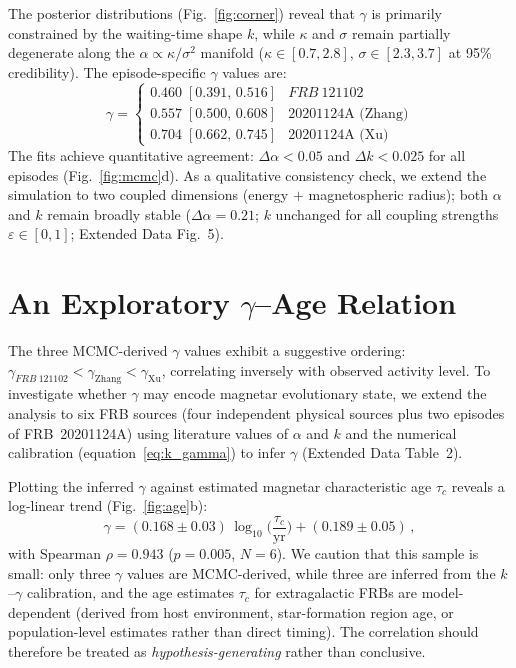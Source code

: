 \documentclass[twocolumn]{article}
\newcommand{\frb}[1]{FRB~#1}
\begin{document}
The posterior distributions (Fig.~\ref{fig:corner}) reveal that $\gamma$ is primarily constrained by the waiting-time shape $k$, while $\kappa$ and $\sigma$ remain partially degenerate along the $\alpha \propto \kappa/\sigma^2$ manifold ($\kappa \in [0.7, 2.8]$, $\sigma \in [2.3, 3.7]$ at 95\% credibility). The episode-specific $\gamma$ values are:
\begin{equation}
\gamma = \begin{cases}
0.460\;[0.391,\,0.516] & \frb{121102}\\
0.557\;[0.500,\,0.608] & \text{20201124A (Zhang)}\\
0.704\;[0.662,\,0.745] & \text{20201124A (Xu)}
\end{cases}
\label{eq:gamma_values}
\end{equation}
The fits achieve quantitative agreement: $\Delta\alpha < 0.05$ and $\Delta k < 0.025$ for all episodes (Fig.~\ref{fig:mcmc}d). As a qualitative consistency check, we extend the simulation to two coupled dimensions (energy $+$ magnetospheric radius); both $\alpha$ and $k$ remain broadly stable ($\Delta\alpha = 0.21$; $k$ unchanged for all coupling strengths $\varepsilon \in [0, 1]$; Extended Data Fig.~5).


\section{An Exploratory $\gamma$--Age Relation}
\label{sec:age}

The three MCMC-derived $\gamma$ values exhibit a suggestive ordering: $\gamma_{\frb{121102}} < \gamma_{\text{Zhang}} < \gamma_{\text{Xu}}$, correlating inversely with observed activity level. To investigate whether $\gamma$ may encode magnetar evolutionary state, we extend the analysis to six FRB sources (four independent physical sources plus two episodes of \frb{20201124A}) using literature values of $\alpha$ and $k$ and the numerical calibration (equation~\ref{eq:k_gamma}) to infer $\gamma$ (Extended Data Table~2).

Plotting the inferred $\gamma$ against estimated magnetar characteristic age $\tau_c$ reveals a log-linear trend (Fig.~\ref{fig:age}b):
\begin{equation}
\gamma = (0.168 \pm 0.03)\,\log_{10}\!\biggl(\frac{\tau_c}{\mathrm{yr}}\biggr) + (0.189 \pm 0.05)\,,
\label{eq:age}
\end{equation}
with Spearman $\rho = 0.943$ ($p = 0.005$, $N = 6$). We caution that this sample is small: only three $\gamma$ values are MCMC-derived, while three are inferred from the $k$--$\gamma$ calibration, and the age estimates $\tau_c$ for extragalactic FRBs are model-dependent (derived from host environment, star-formation region age, or population-level estimates rather than direct timing). The correlation should therefore be treated as \emph{hypothesis-generating} rather than conclusive.
\end{document}
